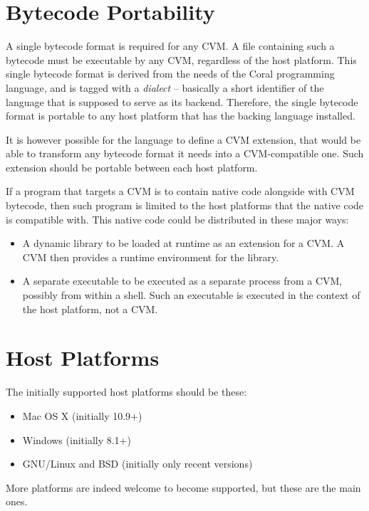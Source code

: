 \section{Bytecode Portability}

A single bytecode format is required for any CVM. A file containing such a bytecode must be executable by any CVM, regardless of the host platform. This single bytecode format is derived from the needs of the Coral programming language, and is tagged with a {\em dialect} -- basically a short identifier of the language that is supposed to serve as its backend. Therefore, the single bytecode format is portable to any host platform that has the backing language installed. 

It is however possible for the language to define a CVM extension, that would be able to transform any bytecode format it needs into a CVM-compatible one. Such extension should be portable between each host platform. 

If a program that targets a CVM is to contain native code alongside with CVM bytecode, then such program is limited to the host platforms that the native code is compatible with. This native code could be distributed in these major ways: 
\begin{itemize}
\item A dynamic library to be loaded at runtime as an extension for a CVM. A CVM then provides a runtime environment for the library. 
\item A separate executable to be executed as a separate process from a CVM, possibly from within a shell. Such an executable is executed in the context of the host platform, not a CVM. 
\end{itemize}





\section{Host Platforms}

The initially supported host platforms should be these:
\begin{itemize}
\item Mac OS X (initially 10.9+)
\item Windows (initially 8.1+)
\item GNU/Linux and BSD (initially only recent versions)
\end{itemize}

More platforms are indeed welcome to become supported, but these are the main ones. 







